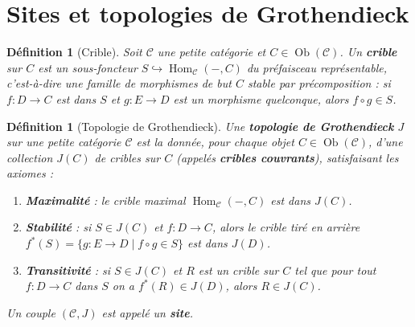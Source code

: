\documentclass[a4paper,12pt]{book}
\DeclareMathOperator{\Hom}{Hom}
\DeclareMathOperator{\Ob}{Ob}
\newtheorem{definition}[theoreme]{Définition}
\begin{document}

\section{Sites et topologies de Grothendieck}\label{sec:sites}

\begin{definition}[Crible]\label{def:crible}
Soit $\mathcal{C}$ une petite catégorie et $C \in \Ob(\mathcal{C})$.
Un \textbf{crible} sur $C$ est un sous-foncteur
$S \hookrightarrow \Hom_\mathcal{C}(-, C)$
du préfaisceau représentable, c'est-à-dire une famille de morphismes
de but $C$ stable par précomposition : si $f \colon D \to C$ est dans
$S$ et $g \colon E \to D$ est un morphisme quelconque, alors
$f \circ g \in S$.
\end{definition}

\begin{definition}[Topologie de Grothendieck]\label{def:topologie-grothendieck}
Une \textbf{topologie de Grothendieck} $J$ sur une petite catégorie
$\mathcal{C}$ est la donnée, pour chaque objet $C \in \Ob(\mathcal{C})$,
d'une collection $J(C)$ de cribles sur $C$ (appelés \textbf{cribles
couvrants}), satisfaisant les axiomes :
\begin{enumerate}[label=(T\arabic*)]
\item \textbf{Maximalité} : le crible maximal
      $\Hom_\mathcal{C}(-, C)$ est dans $J(C)$.
\item \textbf{Stabilité} : si $S \in J(C)$ et $f \colon D \to C$,
      alors le crible tiré en arrière
      $f^*(S) = \{g \colon E \to D \mid f \circ g \in S\}$
      est dans $J(D)$.
\item \textbf{Transitivité} : si $S \in J(C)$ et $R$ est un crible
      sur $C$ tel que pour tout $f \colon D \to C$ dans $S$ on a
      $f^*(R) \in J(D)$, alors $R \in J(C)$.
\end{enumerate}
Un couple $(\mathcal{C}, J)$ est appelé un \textbf{site}.
\end{definition}
\end{document}
